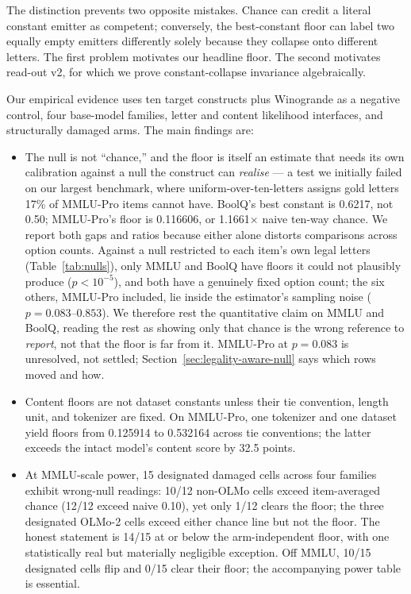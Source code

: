 The distinction prevents two opposite mistakes. Chance can credit a literal constant emitter as competent; conversely, the best-constant floor can label two equally empty emitters differently solely because they collapse onto different letters. The first problem motivates our headline floor. The second motivates read-out v2, for which we prove constant-collapse invariance algebraically.

Our empirical evidence uses ten target constructs plus Winogrande as a negative control, four base-model families, letter and content likelihood interfaces, and structurally damaged arms. The main findings are:

\begin{itemize}[leftmargin=*,nosep]
    \item The null is not ``chance,'' and the floor is itself an estimate that needs its own calibration against a null the construct can \emph{realise} --- a test we initially failed on our largest benchmark, where uniform-over-ten-letters assigns gold letters 17\% of MMLU-Pro items cannot have. BoolQ's best constant is 0.6217, not 0.50; MMLU-Pro's floor is 0.116606, or 1.1661$\times$ naive ten-way chance. We report both gaps and ratios because either alone distorts comparisons across option counts. Against a null restricted to each item's own legal letters (Table~\ref{tab:nulls}), only MMLU and BoolQ have floors it could not plausibly produce ($p<10^{-5}$), and both have a genuinely fixed option count; the six others, MMLU-Pro included, lie inside the estimator's sampling noise ($p=0.083$--$0.853$). We therefore rest the quantitative claim on MMLU and BoolQ, reading the rest as showing only that chance is the wrong reference to \emph{report}, not that the floor is far from it. MMLU-Pro at $p=0.083$ is unresolved, not settled; Section~\ref{sec:legality-aware-null} says which rows moved and how.
    \item Content floors are not dataset constants unless their tie convention, length unit, and tokenizer are fixed. On MMLU-Pro, one tokenizer and one dataset yield floors from 0.125914 to 0.532164 across tie conventions; the latter exceeds the intact model's content score by 32.5 points.
    \item At MMLU-scale power, 15 designated damaged cells across four families exhibit wrong-null readings: 10/12 non-OLMo cells exceed item-averaged chance (12/12 exceed naive 0.10), yet only 1/12 clears the floor; the three designated OLMo-2 cells exceed either chance line but not the floor. The honest statement is 14/15 at or below the arm-independent floor, with one statistically real but materially negligible exception. Off MMLU, 10/15 designated cells flip and 0/15 clear their floor; the accompanying power table is essential.

\end{itemize}
